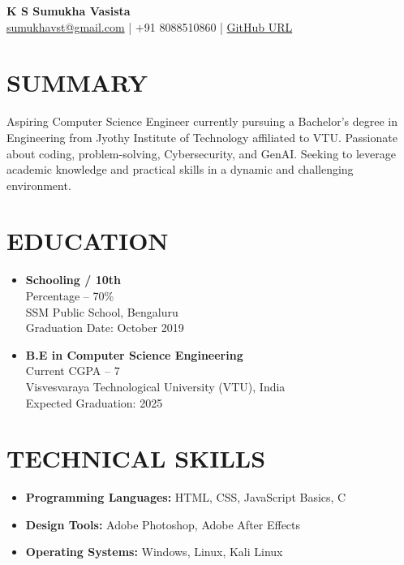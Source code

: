 \documentclass[a4paper,10pt]{article}
\begin{document}
\begin{center}
    {\LARGE \textbf{K S Sumukha Vasista}} \\
    \vspace{0.1cm}
    \href{mailto:sumukhavst@gmail.com}{sumukhavst@gmail.com} | +91 8088510860 | \href{https://github.com/sumukhavasista}{GitHub URL}
\end{center}

\vspace{0.2cm}

\section*{SUMMARY}
Aspiring Computer Science Engineer currently pursuing a Bachelor's degree in Engineering from Jyothy Institute of Technology affiliated to VTU. Passionate about coding, problem-solving, Cybersecurity, and GenAI. Seeking to leverage academic knowledge and practical skills in a dynamic and challenging environment.

\section*{EDUCATION}
\begin{itemize}[leftmargin=0.3cm, itemsep=0pt, topsep=0pt]
    \item \textbf{Schooling / 10th} \\
    Percentage – 70\% \\
    SSM Public School, Bengaluru \\
    Graduation Date: October 2019

    \item \textbf{B.E in Computer Science Engineering} \\
    Current CGPA – 7 \\
    Visvesvaraya Technological University (VTU), India \\
    Expected Graduation: 2025
\end{itemize}

\section*{TECHNICAL SKILLS}
\begin{itemize}[leftmargin=0.3cm, itemsep=0pt, topsep=0pt]
    \item \textbf{Programming Languages:} HTML, CSS, JavaScript Basics, C
    \item \textbf{Design Tools:} Adobe Photoshop, Adobe After Effects
    \item \textbf{Operating Systems:} Windows, Linux, Kali Linux
\end{itemize}
\end{document}
